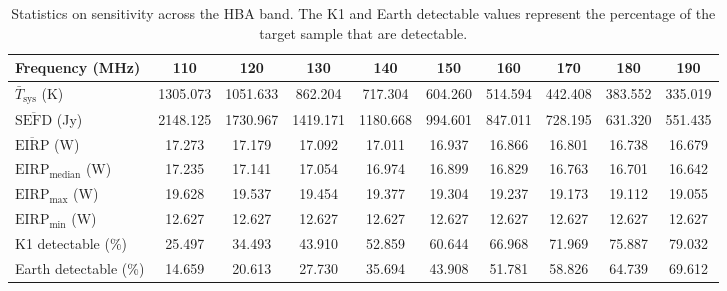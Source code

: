 \begin{table}[!ht]
    \centering
    \begin{tabular}{l|ccccccccc}
    \hline
        \textbf{Frequency (MHz)} & 110 & 120 & 130 & 140 & 150 & 160 & 170 & 180 & 190 \\ \hline
        $\bar T_{\text{sys}}$ (K) & 1305.073 &  1051.633 &   862.204 &   717.304 &  604.260 &  514.594 &  442.408 &  383.552 &  335.019 \\
        $\overline{\text{SEFD}}$ (Jy) &2148.125 &  1730.967 &  1419.171 &  1180.668 &  994.601 &  847.011 &  728.195 &  631.320 &  551.435 \\
        $\overline{\text{EIRP}}$ (W) & 17.273 &    17.179 &    17.092 &    17.011 &   16.937 &   16.866 &   16.801 &   16.738 &   16.679 \\ 
        $\text{EIRP}_\text{median}$ (W) & 17.235 &    17.141 &    17.054 &    16.974 &   16.899 &   16.829 &   16.763 &   16.701 &   16.642 \\
         ${\text{EIRP}_\text{max}}$ (W)& 19.628 &    19.537 &    19.454 &    19.377 &    19.304 &   19.237 &   19.173 &   19.112 &   19.055 \\ 
        ${\text{EIRP}_\text{min}}$ (W)&12.627 &    12.627 &    12.627 &    12.627 &   12.627 &   12.627 &   12.627 &   12.627 &   12.627 \\
        K1 detectable (\%) &   25.497 &    34.493 &    43.910 &    52.859 &   60.644 &   66.968 &   71.969 &   75.887 &   79.032 \\
        Earth detectable (\%) & 14.659 &    20.613 &    27.730 &    35.694 &   43.908 &   51.781 &   58.826 &   64.739 &   69.612 \\\hline \hline 
    \end{tabular}
    \caption{Statistics on sensitivity across the HBA band. The K1 and Earth detectable values represent the percentage of the target sample that are detectable.}
\end{table}
